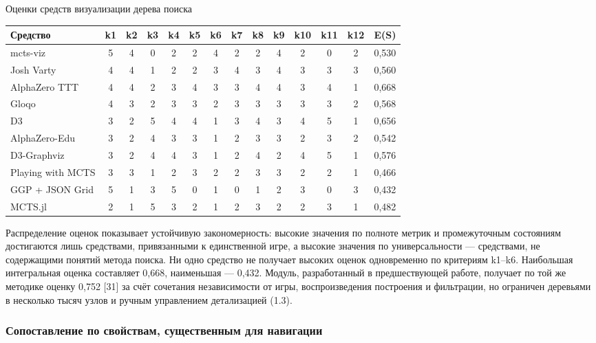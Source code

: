 \begin{gosttable}{}{Оценки средств визуализации дерева поиска}

\begin{tabularx}{\linewidth}{>{\raggedright\arraybackslash}Xccccccccccccc}
\hline
Средство & k1 & k2 & k3 & k4 & k5 & k6 & k7 & k8 & k9 & k10 & k11 & k12 & E(S) \\
\hline
mcts-viz & 5 & 4 & 0 & 2 & 2 & 4 & 2 & 2 & 4 & 2 & 0 & 2 & 0,530 \\
\hline
Josh Varty & 4 & 4 & 1 & 2 & 2 & 3 & 4 & 3 & 4 & 3 & 3 & 3 & 0,560 \\
\hline
AlphaZero TTT & 4 & 4 & 2 & 3 & 4 & 3 & 3 & 4 & 4 & 3 & 4 & 1 & 0,668 \\
\hline
Gloqo & 4 & 3 & 2 & 3 & 3 & 2 & 3 & 3 & 3 & 3 & 3 & 2 & 0,568 \\
\hline
D3 & 3 & 2 & 5 & 4 & 4 & 1 & 3 & 4 & 3 & 4 & 5 & 1 & 0,656 \\
\hline
AlphaZero-Edu & 3 & 2 & 4 & 3 & 3 & 1 & 2 & 3 & 3 & 2 & 3 & 2 & 0,542 \\
\hline
D3-Graphviz & 3 & 2 & 4 & 4 & 3 & 1 & 2 & 4 & 2 & 4 & 5 & 1 & 0,576 \\
\hline
Playing with MCTS & 3 & 3 & 1 & 2 & 3 & 2 & 2 & 3 & 3 & 2 & 2 & 1 & 0,466 \\
\hline
GGP + JSON Grid & 5 & 1 & 3 & 5 & 0 & 1 & 0 & 1 & 2 & 3 & 0 & 3 & 0,432 \\
\hline
MCTS.jl & 2 & 1 & 5 & 3 & 2 & 1 & 2 & 3 & 2 & 2 & 3 & 1 & 0,482 \\
\hline
\end{tabularx}

\end{gosttable}

Распределение оценок показывает устойчивую закономерность: высокие значения по полноте метрик и промежуточным состояниям достигаются лишь средствами, привязанными к единственной игре, а высокие значения по универсальности — средствами, не содержащими понятий метода поиска. Ни одно средство не получает высоких оценок одновременно по критериям k1–k6. Наибольшая интегральная оценка составляет 0,668, наименьшая — 0,432. Модуль, разработанный в предшествующей работе, получает по той же методике оценку 0,752 [31] за счёт сочетания независимости от игры, воспроизведения построения и фильтрации, но ограничен деревьями в несколько тысяч узлов и ручным управлением детализацией (1.3).

\subsubsection{Сопоставление по свойствам, существенным для навигации}

